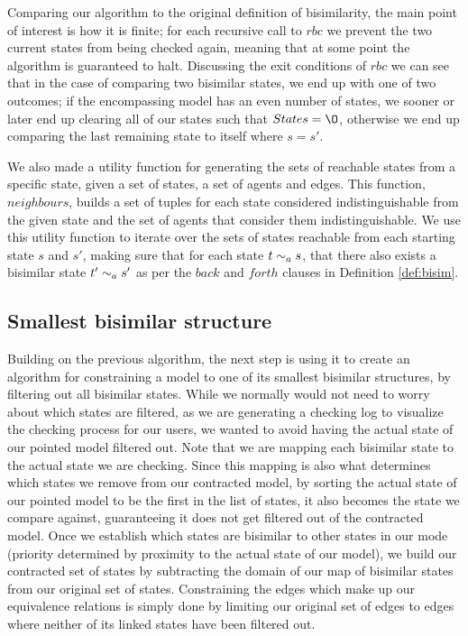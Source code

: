 Comparing our algorithm to the original definition of bisimilarity, the main point of interest is how it is finite; for each recursive call to $rbc$ we prevent the two current states from being checked again, meaning that at some point the algorithm is guaranteed to halt. Discussing the exit conditions of $rbc$ we can see that in the case of comparing two bisimilar states, we end up with one of two outcomes; if the encompassing model has an even number of states, we sooner or later end up clearing all of our states such that $States = \O$, otherwise we end up comparing the last remaining state to itself where $s = s'$.

We also made a utility function for generating the sets of reachable states from a specific state, given a set of states, a set of agents and edges. This function, $neighbours$, builds a set of tuples for each state considered indistinguishable from the given state and the set of agents that consider them indistinguishable. We use this utility function to iterate over the sets of states reachable from each starting state $s$ and $s'$, making sure that for each state $t\sim_a s$, that there also exists a bisimilar state $t'\sim_a s'$ as per the $back$ and $forth$ clauses in Definition \ref{def:bisim}.


\subsection{Smallest bisimilar structure}

Building on the previous algorithm, the next step is using it to create an algorithm for constraining a model to one of its smallest bisimilar structures, by filtering out all bisimilar states. While we normally would not need to worry about which states are filtered, as we are generating a checking log to visualize the checking process for our users, we wanted to avoid having the actual state of our pointed model filtered out. Note that we are mapping each bisimilar state to the actual state we are checking. Since this mapping is also what determines which states we remove from our contracted model, by sorting the actual state of our pointed model to be the first in the list of states, it also becomes the state we compare against, guaranteeing it does not get filtered out of the contracted model. Once we establish which states are bisimilar to other states in our mode (priority determined by proximity to the actual state of our model), we build our contracted set of states by subtracting the domain of our map of bisimilar states from our original set of states. Constraining the edges which make up our equivalence relations is simply done by limiting our original set of edges to edges where neither of its linked states have been filtered out.

